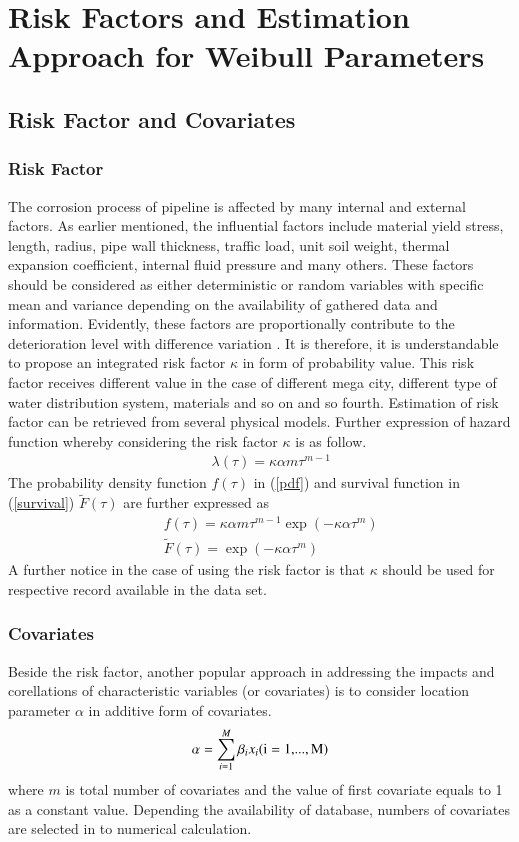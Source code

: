 \documentclass[a4paper,oneside,onecolumn,preprint,10pt,authoryear]{elsarticle}
\begin{document}
\section{Risk Factors and Estimation Approach for Weibull Parameters}
\label{55}
\subsection{Risk Factor and Covariates}
\label{551}
\subsubsection{Risk Factor}
\label{5511}
The corrosion process of pipeline is affected by many internal and external factors. As earlier mentioned, the influential factors include material yield stress, length, radius, pipe wall thickness, traffic load, unit soil weight, thermal expansion coefficient, internal fluid pressure and many others. These factors should be considered as either deterministic or random variables with specific mean and variance depending on the availability of gathered data and information. Evidently, these factors are proportionally contribute to the deterioration level with difference variation \cite{ahammed95,ahammed97}. It is therefore, it is understandable to propose an integrated risk factor $\kappa$ in form of probability value. This risk factor receives different value in the case of different mega city, different type of water distribution system, materials and so on and so fourth. Estimation of risk factor can be retrieved from several physical models. Further expression of hazard function whereby considering the risk factor $\kappa$ is as follow.
\begin{eqnarray}
&& \lambda(\tau)= \kappa \alpha m \tau^{m-1} \label{weibul1}
\end{eqnarray}
The probability density function $f(\tau)$ in (\ref{pdf}) and survival function in (\ref{survival}) $\tilde{F}(\tau)$ are further expressed as
\begin{eqnarray}
&& f(\tau)=\kappa \alpha m\tau^{m-1}\exp(-\kappa \alpha \tau^m) \label{pdf1} \\
&& \tilde{F}(\tau)=\exp(-\kappa \alpha \tau^m) \label{survival1}
\end{eqnarray}
A further notice in the case of using the risk factor is that $\kappa$ should be used for respective record available in the data set.
\subsubsection{Covariates}
\label{5512}
Beside the risk factor, another popular approach in addressing the impacts and corellations of characteristic variables (or covariates) is to consider location parameter $\alpha$ in additive form of covariates. 
\begin{eqnarray}
\alpha  = \sum\limits_{i = 1}^M {\beta _i x_i \rm{     (i = 1,}}...{\rm{,M)}} \label{covariate}
\end{eqnarray}
where $m$ is total number of covariates and the value of first covariate equals to 1 as a constant value. Depending the availability of database, numbers of covariates are selected in to numerical calculation.
\end{document}

